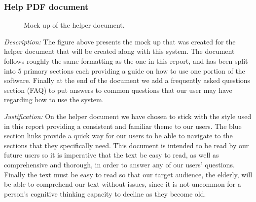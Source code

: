 \subsubsection{Help PDF document}

\begin{figure}[H]
\centering


\caption{Mock up of the helper document.}
\label{fig:help}
\end{figure}

\textit{Description:} The figure above presents the mock up 
that was created for the helper document that will be 
created along with this system. The document follows roughly
the same formatting as the one in this report, and has been 
split into 5 primary sections each providing a guide on how 
to use one portion of the software. Finally at the end of
the document we add a frequently asked questions section 
(FAQ) to put answers to common questions that our user may 
have regarding how to use the system.
\\ \vspace{0.2cm}

\textit{Justification:}
On the helper document we have chosen to stick with the
style used in this report providing a consistent and 
familiar theme to our users. The blue section links 
provide a quick way for our users to be able to navigate
to the sections that they specifically need. This document is
intended to be read by our future users so it is imperative 
that the text be easy to read, as well as comprehensive and 
thorough, in order to answer any of our users' questions.
Finally the text must be easy to read so that our target 
audience, the elderly, will be able to comprehend our text
without issues, since it is not uncommon for a person's 
cognitive thinking capacity to decline as they become old.

